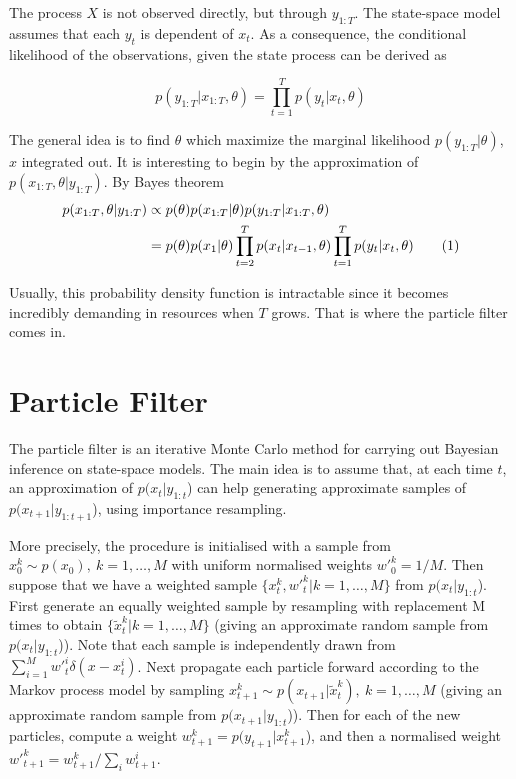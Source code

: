 \documentclass[11pt,a4,twosided,singlespacing,titlepagenumber=on]{scrreprt}
\numberwithin{equation}{chapter} %
\theoremstyle{remark}
\newcommand\numberthis{\addtocounter{equation}{1}\tag{\theequation}}
\begin{document}
The process $X$ is not observed directly, but through $y_{1:T}$. The state-space model assumes that each $y_t$ is dependent of $x_t$. As a consequence, the conditional likelihood of the observations, given the state process can be derived as

\begin{equation}
p(y_{1:T} | x_{1:T}, \theta) = \prod_{t=1}^T p(y_t | x_t, \theta) 
\end{equation}

The general idea is to find $\theta$ which maximize the marginal likelihood $p(y_{1:T}|\theta)$, $x$ integrated out. It is interesting to begin by the approximation of $p(x_{1:T}, \theta | y_{1:T})$. By Bayes theorem
\begin{align*}
p(x_{1:T}, \theta | y_{1:T}) &\propto p(\theta)p(x_{1:T}|\theta)p(y_{1:T}|x_{1:T}, \theta)  \\
 &= p(\theta) p(x_1|\theta) \prod_{t=2}^T p(x_t|x_{t-1}, \theta) \prod_{t=1}^T p(y_t | x_t, \theta) \numberthis
\end{align*}


Usually, this probability density function is intractable since it becomes incredibly demanding in resources when $T$ grows. That is where the particle filter comes in.

\section{Particle Filter}

The particle filter is an iterative Monte Carlo method for carrying out Bayesian inference on state-space models. The main idea is to assume that, at each time $t$, an approximation of $p(x_t|y_{1:t}$) can help generating approximate samples of $p(x_{t+1}|y_{1:t+1}$), using importance resampling.


More precisely, the procedure is initialised with a sample from $x_0^k \sim p(x_0),\ k=1,\ldots,M$ with uniform normalised weights ${w'}_0^k=1/M$. Then suppose that we have a weighted sample $\{x_t^k,{w'}_t^k|k=1,\ldots,M\}$ from $p(x_t|y_{1:t}$). First generate an equally weighted sample by resampling with replacement M times to obtain $\{\tilde{x}_t^k|k=1,\ldots,M\}$ (giving an approximate random sample from $p(x_t|y_{1:t}$)). Note that each sample is independently drawn from $\sum_{i=1}^M {w'}_t^i\delta(x-x_t^i)$. Next propagate each particle forward according to the Markov process model by sampling $x_{t+1}^k\sim p(x_{t+1}|\tilde{x}_t^k),\ k=1,\ldots,M$ (giving an approximate random sample from $p(x_{t+1}|y_{1:t}$)). Then for each of the new particles, compute a weight $w_{t+1}^k=p(y_{t+1}|x_{t+1}^k$), and then a normalised weight ${w'}_{t+1}^k=w_{t+1}^k/\sum_i w_{t+1}^i$. \\
\end{document}
